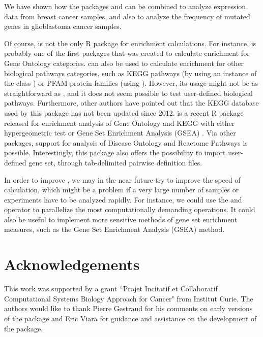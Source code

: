 \documentclass[article]{jss}
\begin{document}
We have shown how the packages  and  can be
combined to analyze expression data from breast cancer samples, and also to
analyze the frequency of mutated genes in glioblastoma cancer samples.  

Of course,  is not the only R package for enrichment
calculations. For instance,  \citep{falcon2007using} is probably
one of the first packages that was created to calculate enrichment for Gene
Ontology categories.   can also be used to calculate enrichment for
other biological pathways categories, such as KEGG pathways (by using an
instance of the class ) or PFAM protein families (using
). However, its usage might not be as straightforward as
, and it does not seem possible to test user-defined biological
pathways. Furthermore, other authors have pointed out that the KEGG database
used by this package has not been updated since 2012.  is a
recent R package released for enrichment analysis of Gene Ontology and KEGG with
either hypergeometric test or Gene Set Enrichment Analysis (GSEA)
\citep{yu2012clusterprofiler}. Via other packages, support for analysis of
Disease Ontology and Reactome Pathways is possible. Interestingly, this package
also offers the possibility to import user-defined gene set, through
tab-delimited pairwise definition files.   

In order to improve , we may in the near future try to improve
the speed of calculation, which might be a problem if a very large number of
samples or experiments have to be analyzed rapidly. For instance, we could use
the  and  operator to parallelize the most
computationally demanding operations. It could also be useful to implement more
sensitive methods of gene set enrichment measures, such as the Gene Set
Enrichment Analysis (GSEA) method. 


\section[Acknowledgments]{Acknowledgements}

This work was supported by a grant ``Projet Incitatif et Collaboratif
Computational Systems Biology Approach for Cancer" from Institut Curie. The
authors would like to thank Pierre Gestraud for his comments on early versions
of the  package and Eric Viara for guidance and assistance on
the development of the  package.

%

\end{document}
